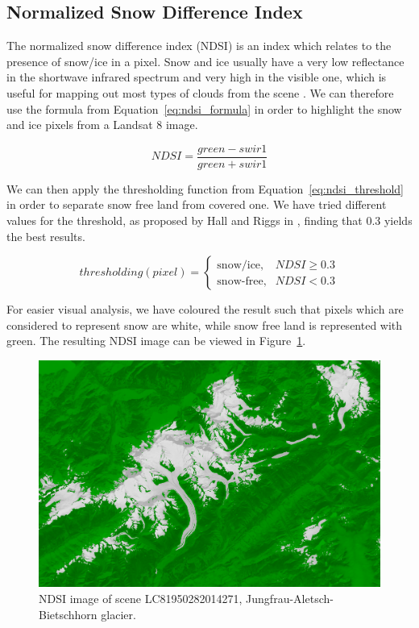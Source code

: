 \documentclass[12pt, a4paper]{report}
\begin{document}
	
	\subsection{Normalized Snow Difference Index}
	\label{seq:ndsi_functional}
	
	\par The normalized snow difference index (NDSI) is an index which relates to the presence of snow/ice in a pixel. Snow and ice usually have a very low reflectance in the shortwave infrared spectrum and very high in the visible one, which is useful for mapping out most types of clouds from the scene \cite{ndsi}. We can therefore use the formula from Equation~\ref{eq:ndsi_formula} in order to highlight the snow and ice pixels from a Landsat 8 image.
	
	\begin{equation}\label{eq:ndsi_formula}
		NDSI = \frac{green - swir1}{green + swir1}
	\end{equation}

	\par We can then apply the thresholding function from Equation~\ref{eq:ndsi_threshold} in order to separate snow free land from covered one. We have tried different values for the threshold, as proposed by Hall and Riggs in \cite{Hall2001}, finding that 0.3 yields the best results.
	
	\begin{equation}
		thresholding(pixel) = \left.
		\begin{cases}\label{eq:ndsi_threshold}
			\text{snow/ice},  & NDSI \geq 0.3\\
			\text{snow-free}, & NDSI < 0.3
		\end{cases}
		\right.
	\end{equation}

	\par For easier visual analysis, we have coloured the result such that pixels which are considered to represent snow are white, while snow free land is represented with green. The resulting NDSI image can be viewed in Figure~\ref{fig:ndsi}.
	
	\begin{figure}[h!]
		\centering
		\includegraphics[width=\columnwidth]{../images/LC81950282014271_ndsi.png}
		\caption{NDSI image of scene LC81950282014271, Jungfrau-Aletsch-Bietschhorn glacier.}
		\label{fig:ndsi}
	\end{figure}
\end{document}
